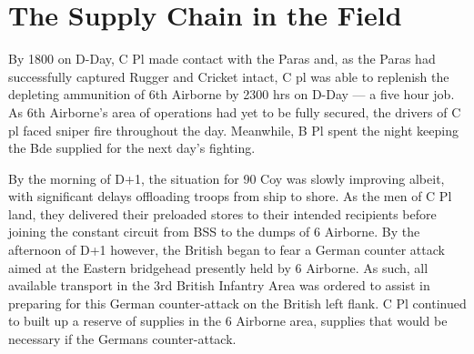 \documentclass[noraggedright]{turabian-researchpaper}
\begin{document}


\section{The Supply Chain in the Field}

By 1800 on D-Day, C Pl made contact with the Paras and, as the Paras 
had successfully captured Rugger and Cricket intact, C pl was able to 
replenish the depleting ammunition of 6th Airborne by 2300 hrs on D-Day 
--- a five hour job.  As 6th Airborne's area of operations had yet to be fully 
secured, the drivers of C pl faced sniper fire throughout the 
day.\autocite[6 June 1944]{90wd}  Meanwhile, B Pl spent the night keeping the
Bde supplied for the next day's fighting. %

By the morning of D+1, the situation for 90 Coy was slowly improving albeit,
with significant delays offloading troops from ship to shore.  As the
men of C Pl land, they delivered their preloaded stores to their intended 
recipients before joining the constant circuit from BSS to
the dumps of 6 Airborne. %
By the afternoon of D+1 however, the British began to fear a German counter 
attack aimed at the Eastern bridgehead presently held by 6 Airborne.  As such,
all available transport in the 3rd British Infantry Area was ordered to 
assist in preparing for this German counter-attack on the British left flank. 
C Pl continued to built up a reserve of supplies in the 6 Airborne
area, supplies that would be necessary if the Germans counter-attack.  
\end{document}
